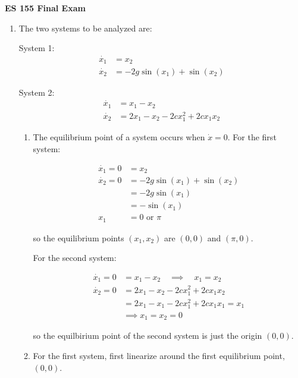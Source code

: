 \documentclass[11pt]{article}
\theoremstyle{definition}
\begin{document}
\textbf{\huge{ES 155 Final Exam}}    %
\normalsize

\begin{enumerate}

    \item %
    The two systems to be analyzed are:

    System 1:
    \begin{align*}
        \dot{x_1} &= x_2 \\
        \dot{x_2} &= -2g \sin(x_1) + \sin(x_2)
    \end{align*}

    System 2:
    \begin{align*}
        \dot{x_1} &= x_1 - x_2 \\
        \dot{x_2} &= 2x_1 - x_2 - 2c x_1^2 + 2c x_1 x_2
    \end{align*}

    \begin{enumerate}
        \item %
        The equilibrium point of a system occurs when $\dot{x} = 0$.  For the first system:

        \begin{align*}
            \dot{x_1} = 0 &= x_2 \\
            \dot{x_2} = 0 &= -2g \sin(x_1) + \sin(x_2)  \\
            &= -2g \sin(x_1) \\
            &= - \sin(x_1) \\
            x_1 &= 0 \text{ or } \pi
        \end{align*}

        so the equilibrium points $(x_1, x_2)$ are $(0,0)$ and $(\pi, 0)$.

        For the second system:

        \begin{align*}
            \dot{x_1} = 0 &= x_1  - x_2 \quad \implies \quad x_1 = x_2 \\
            \dot{x_2} = 0 &= 2x_1 - x_2 - 2c x_1^2 + 2c x_1 x_2 \\
            &= 2x_1 - x_1 - 2c x_1^2 + 2c x_1 x_1 = x_1 \\
            &\implies x_1 = x_2 = 0
        \end{align*}

        so the equilbirium point of the second system is just the origin $(0,0)$.

        \item %
        For the first system, first linearize around the first equilibrium point, $(0,0)$.


\end{enumerate}
\end{enumerate}
\end{document}

